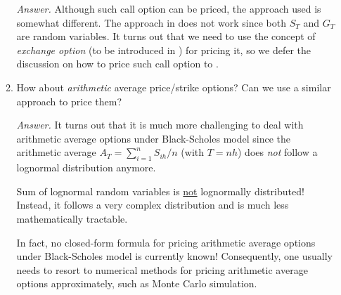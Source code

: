 \begin{enumerate}
\begin{enumerate}[label={Q\arabic*}]
\emph{Answer.} Although such call option can be priced, the approach used is
somewhat different. The approach in  does not
work since both \(S_T\) and \(G_T\) are random variables. It turns out that we
need to use the concept of \emph{exchange option} (to be introduced in
) for pricing it, so we defer the discussion on how
to price such call option to .

\item How about \emph{arithmetic} average price/strike options? Can we use a
similar approach to price them?

\emph{Answer.} It turns out that it is much more challenging to deal with
arithmetic average options under Black-Scholes model since the arithmetic
average \(A_T=\sum_{i=1}^{n}S_{ih}/n\) (with \(T=nh\)) does \emph{not} follow a
lognormal distribution anymore. \begin{warning}
Sum of lognormal random variables is \underline{not} lognormally distributed!
Instead, it follows a very complex distribution and is much less mathematically
tractable.
\end{warning}
In fact, no closed-form formula for pricing arithmetic average options under
Black-Scholes model is currently known! Consequently, one usually needs to
resort to numerical methods for pricing arithmetic average options
approximately, such as Monte Carlo simulation.
\end{enumerate}
\end{enumerate}
